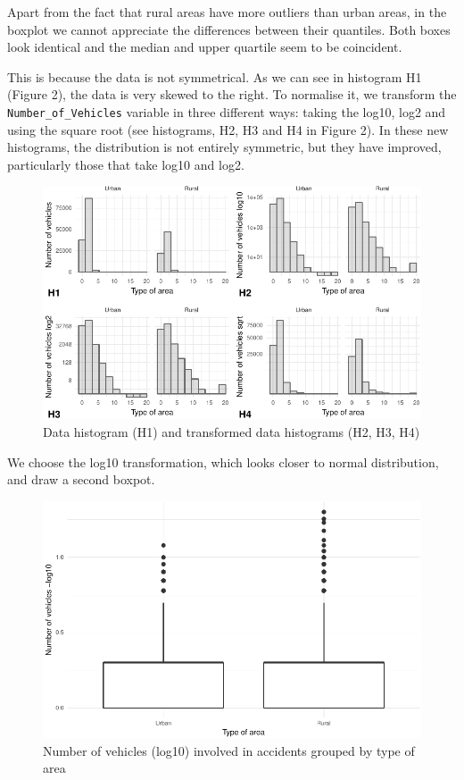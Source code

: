 \documentclass[]{article}
\begin{document}
Apart from the fact that rural areas have more outliers than urban
areas, in the boxplot we cannot appreciate the differences between their
quantiles. Both boxes look identical and the median and upper quartile
seem to be coincident.

This is because the data is not symmetrical. As we can see in histogram
H1 (Figure 2), the data is very skewed to the right. To normalise it, we
transform the \texttt{Number\_of\_Vehicles} variable in three different
ways: taking the log10, log2 and using the square root (see histograms,
H2, H3 and H4 in Figure 2). In these new histograms, the distribution is
not entirely symmetric, but they have improved, particularly those that
take log10 and log2.

\begin{figure}[H]

{\centering \includegraphics{README_files/figure-latex/fig2-1} 

}

\caption{Data histogram (H1) and transformed data histograms (H2, H3, H4)}\label{fig:fig2}
\end{figure}

We choose the log10 transformation, which looks closer to normal
distribution, and draw a second boxpot.

\begin{figure}[H]

{\centering \includegraphics{README_files/figure-latex/fig3-1} 

}

\caption{Number of vehicles (log10) involved in accidents grouped by type of area}\label{fig:fig3}
\end{figure}
\end{document}
